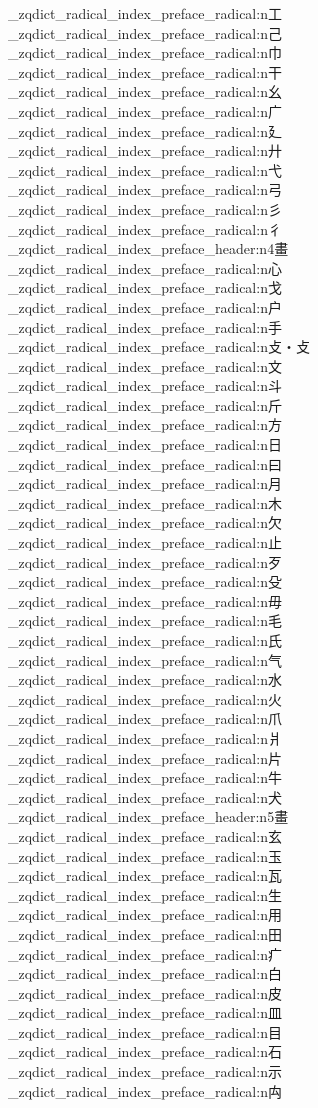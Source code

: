 {\begin{multicols}{5}
  \_zqdict_radical_index_preface_radical:n{工}
  \_zqdict_radical_index_preface_radical:n{己}
  \_zqdict_radical_index_preface_radical:n{巾}
  \_zqdict_radical_index_preface_radical:n{干}
  \_zqdict_radical_index_preface_radical:n{幺}
  \_zqdict_radical_index_preface_radical:n{广}
  \_zqdict_radical_index_preface_radical:n{廴}
  \_zqdict_radical_index_preface_radical:n{廾}
  \_zqdict_radical_index_preface_radical:n{弋}
  \_zqdict_radical_index_preface_radical:n{弓}
  \_zqdict_radical_index_preface_radical:n{彡}
  \_zqdict_radical_index_preface_radical:n{彳}
  \_zqdict_radical_index_preface_header:n{4畫}
  \_zqdict_radical_index_preface_radical:n{心}
  \_zqdict_radical_index_preface_radical:n{戈}
  \_zqdict_radical_index_preface_radical:n{户}
  \_zqdict_radical_index_preface_radical:n{手}
  \_zqdict_radical_index_preface_radical:n{攴・攴}
  \_zqdict_radical_index_preface_radical:n{文}
  \_zqdict_radical_index_preface_radical:n{斗}
  \_zqdict_radical_index_preface_radical:n{斤}
  \_zqdict_radical_index_preface_radical:n{方}
  \_zqdict_radical_index_preface_radical:n{日}
  \_zqdict_radical_index_preface_radical:n{曰}
  \_zqdict_radical_index_preface_radical:n{月}
  \_zqdict_radical_index_preface_radical:n{木}
  \_zqdict_radical_index_preface_radical:n{欠}
  \_zqdict_radical_index_preface_radical:n{止}
  \_zqdict_radical_index_preface_radical:n{歹}
  \_zqdict_radical_index_preface_radical:n{殳}
  \_zqdict_radical_index_preface_radical:n{毋}
  \_zqdict_radical_index_preface_radical:n{毛}
  \_zqdict_radical_index_preface_radical:n{氏}
  \_zqdict_radical_index_preface_radical:n{气}
  \_zqdict_radical_index_preface_radical:n{水}
  \_zqdict_radical_index_preface_radical:n{火}
  \_zqdict_radical_index_preface_radical:n{爪}
  \_zqdict_radical_index_preface_radical:n{爿}
  \_zqdict_radical_index_preface_radical:n{片}
  \_zqdict_radical_index_preface_radical:n{牛}
  \_zqdict_radical_index_preface_radical:n{犬}
  \_zqdict_radical_index_preface_header:n{5畫}
  \_zqdict_radical_index_preface_radical:n{玄}
  \_zqdict_radical_index_preface_radical:n{玉}
  \_zqdict_radical_index_preface_radical:n{瓦}
  \_zqdict_radical_index_preface_radical:n{生}
  \_zqdict_radical_index_preface_radical:n{用}
  \_zqdict_radical_index_preface_radical:n{田}
  \_zqdict_radical_index_preface_radical:n{疒}
  \_zqdict_radical_index_preface_radical:n{白}
  \_zqdict_radical_index_preface_radical:n{皮}
  \_zqdict_radical_index_preface_radical:n{皿}
  \_zqdict_radical_index_preface_radical:n{目}
  \_zqdict_radical_index_preface_radical:n{石}
  \_zqdict_radical_index_preface_radical:n{示}
  \_zqdict_radical_index_preface_radical:n{禸}

\end{multicols}}
